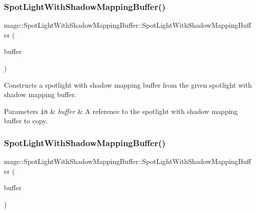 \subsubsection{\texorpdfstring{Spot\+Light\+With\+Shadow\+Mapping\+Buffer()}{SpotLightWithShadowMappingBuffer()}\hspace{0.1cm}{\footnotesize\ttfamily [2/3]}}
{\footnotesize\ttfamily mage\+::\+Spot\+Light\+With\+Shadow\+Mapping\+Buffer\+::\+Spot\+Light\+With\+Shadow\+Mapping\+Buffer (\begin{DoxyParamCaption}\item[{const \hyperlink{structmage_1_1_spot_light_with_shadow_mapping_buffer}{Spot\+Light\+With\+Shadow\+Mapping\+Buffer} \&}]{buffer }\end{DoxyParamCaption})\hspace{0.3cm}{\ttfamily [default]}}

Constructs a spotlight with shadow mapping buffer from the given spotlight with shadow mapping buffer.


\begin{DoxyParams}[1]{Parameters}
\mbox{\tt in}  & {\em buffer} & A reference to the spotlight with shadow mapping buffer to copy. \\
\hline
\end{DoxyParams}
\hypertarget{structmage_1_1_spot_light_with_shadow_mapping_buffer_a933982cf023e052a21da2009f48d9ae1}{}\label{structmage_1_1_spot_light_with_shadow_mapping_buffer_a933982cf023e052a21da2009f48d9ae1} 
\subsubsection{\texorpdfstring{Spot\+Light\+With\+Shadow\+Mapping\+Buffer()}{SpotLightWithShadowMappingBuffer()}\hspace{0.1cm}{\footnotesize\ttfamily [3/3]}}
{\footnotesize\ttfamily mage\+::\+Spot\+Light\+With\+Shadow\+Mapping\+Buffer\+::\+Spot\+Light\+With\+Shadow\+Mapping\+Buffer (\begin{DoxyParamCaption}\item[{\hyperlink{structmage_1_1_spot_light_with_shadow_mapping_buffer}{Spot\+Light\+With\+Shadow\+Mapping\+Buffer} \&\&}]{buffer }\end{DoxyParamCaption})\hspace{0.3cm}{\ttfamily [default]}}

